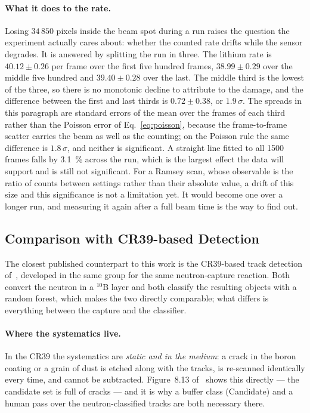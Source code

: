 \documentclass[a4paper,headsepline,oneside,11pt]{scrartcl}
\begin{document}
\paragraph{What it does to the rate.} Losing $34\,850$ pixels inside the beam
spot during a run raises the question the experiment actually cares about:
whether the counted rate drifts while the sensor degrades. It is answered by
splitting the run in three. The lithium rate is $40.12 \pm 0.26$ per frame over
the first five hundred frames, $38.99 \pm 0.29$ over the middle five hundred and
$39.40 \pm 0.28$ over the last. The middle third is the lowest of the three, so
there is no monotonic decline to attribute to the damage, and the difference
between the first and last thirds is $0.72 \pm 0.38$, or $1.9\,\sigma$. The
spreads in this paragraph are standard errors of the mean over the frames of
each third rather than the Poisson error of
Eq.~\eqref{eq:poisson}, because the frame-to-frame scatter carries the beam as
well as the counting; on the Poisson rule the same difference is
$1.8\,\sigma$, and neither is significant. A
straight line fitted to all 1500 frames falls by \SI{3.1}{\percent} across the run, which
is the largest effect the data will support and is still not significant. For a
Ramsey scan, whose observable is the ratio of counts between settings rather than
their absolute value, a drift of this size and this significance is not a
limitation yet. It would become one over a longer run, and measuring it again
after a full beam time is the way to find out.


\subsection{Comparison with CR39-based Detection}
\label{sec:results_cr39}

The closest published counterpart to this work is the CR39-based track detection
of~\cite{Filter2018}, developed in the same group for the same neutron-capture
reaction. Both convert the neutron in a $^{10}$B layer and both classify the
resulting objects with a random forest, which makes the two directly comparable;
what differs is everything between the capture and the classifier.

\paragraph{Where the systematics live.} In the CR39 the systematics are
\emph{static and in the medium}: a crack in the boron coating or a grain of dust
is etched along with the tracks, is re-scanned identically every time, and cannot
be subtracted. Figure~8.13 of~\cite{Filter2018} shows this directly --- the
candidate set is full of cracks --- and it is why a buffer class
(\textsf{Candidate}) and a human pass over the neutron-classified tracks are both
necessary there.
\end{document}
